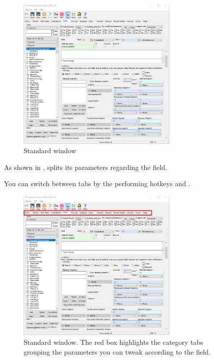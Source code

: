 \begin{appendices}
    \begin{figure}[ht]
        \centering
        \includegraphics[width=0.7\textwidth]{src/images/genie01}
        \caption{Standard \genie{} window}
        \label{fig:genie01}
    \end{figure}

    As shown in , \genie{} splits its parameters regarding the \aoe{} field.

    \begin{info}
        You can switch between tabs by the performing hotkeys  and .
    \end{info}

    \begin{figure}[ht]
        \centering
        \includegraphics[width=0.7\textwidth]{src/images/genie03}
        \caption{Standard \genie{} window. The red box highlights the category tabs grouping the parameters you can tweak according to the \aoe{} field.}
        \label{fig:genie03}
    \end{figure}


\end{appendices}
